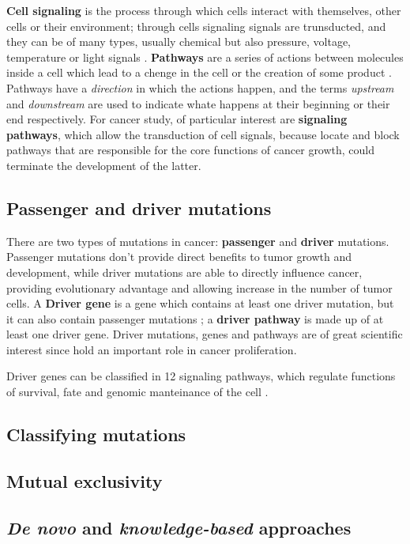\textbf{Cell signaling} is the process through which cells interact with themselves, other cells or their environment; through cells signaling signals are trunsducted, and they can be of many types, usually chemical but also pressure, voltage, temperature or light signals \cite{cell_signaling}. \textbf{Pathways} are a series of actions between molecules inside a cell which lead to a chenge in the cell or the creation of some product \cite{pathway}. Pathways have a \textit{direction} in which the actions happen, and the terms \textit{upstream} and \textit{downstream} are used to indicate whate happens at their beginning or their end respectively. For cancer study, of particular interest are \textbf{signaling pathways}, which allow the transduction of cell signals, because locate and block pathways that are responsible for the core functions of cancer growth, could terminate the development of the latter. 

\subsection{Passenger and driver mutations}

There are two types of mutations in cancer: \textbf{passenger} and \textbf{driver} mutations. Passenger mutations don't provide direct benefits to tumor growth and development, while driver mutations are able to directly influence cancer, providing evolutionary advantage and allowing increase in the number of tumor cells. A \textbf{Driver gene} is a gene which contains at least one driver mutation, but it can also contain passenger mutations ; a \textbf{driver pathway} is made up of at least one driver gene. Driver mutations, genes and pathways are of great scientific interest since hold an important role in cancer proliferation.

Driver genes can be classified in 12 signaling pathways, which regulate functions of survival, fate and genomic manteinance of the cell .

\subsection{Classifying mutations}

\subsection{Mutual exclusivity}

\subsection{\textit{De novo} and \textit{knowledge-based} approaches}

\cleardoublepage
